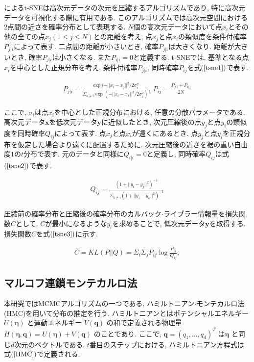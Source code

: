 \documentclass[a4j,12pt]{jarticle}
\begin{document}
\citet{tSNE}によるt-SNEは高次元データの次元を圧縮するアルゴリズムであり, 特に高次元データを可視化する際に有用である. このアルゴリズムでは高次元空間における$2$点間の近さを確率分布として表現する. $N$個の高次元データにおいて点$x_i$とその他の全ての点$x_j (1 \leq j \leq N)$との距離を考え, 点$x_j$と点$x_i$の類似度を条件付確率$P_{j|i}$によって表す. 二点間の距離が小さいとき, 確率$P_{j|i}$は大きくなり. 距離が大きいとき, 確率$P_{j|i}$は小さくなる. また$P_{i|i} = 0$と定義する. t-SNEでは, 基準となる点$x_i$を中心とした正規分布を考え, 条件付確率$P_{j|i}$, 同時確率$P_{ij}$を式$(\ref{tsne1})$で表す.

\begin{eqnarray}
\label{tsne1}
P_{j|i} = \frac{\exp(-||x_i - x_j||^2 / 2\sigma_i^2}{\Sigma_{k \neq i}\exp(-||x_i - x_k||^2/ 2\sigma_i^2)},\ 
P_{ij} = \frac{P_{j|i} + P_{i|j}}{2N}
\end{eqnarray}

\noindent
ここで, $\sigma_i$は点$x_i$を中心とした正規分布における, 任意の分散パラメータである. 高次元データ$\bm x$を低次元データ$\bm y$に近似したとき, 次元圧縮後の点$y_j$と点$y_i$の類似度を同時確率$Q_{ij}$によって表す. 点$x_j$と点$x_i$が遠くにあるとき, 点$y_j$と点$y_i$を正規分布を仮定した場合より遠くに配置するために. 次元圧縮後の近さを裾の重い自由度$1$の$t$分布で表す. 元のデータと同様に$Q_{i|i} = 0$と定義し, 同時確率$Q_{ij}$は式$(\ref{tsne2})$で表す.

\begin{eqnarray}
\label{tsne2}
Q_{ij} = \frac{(1 + ||y_i - y_j||^2)^{-1}}{\Sigma_{k \neq i}(1 + ||y_i - y_k||^2)^{-1}}
\end{eqnarray}

圧縮前の確率分布と圧縮後の確率分布のカルバック$\cdot$ライブラー情報量を損失関数$C$として, $C$が最小になるような$y_i$を求めることで, 低次元データ$\bm y$を取得する. 損失関数$C$を式$(\ref{tsne3})$に示す.

\begin{eqnarray}
\label{tsne3}
C = KL(P || Q) = \Sigma_i \Sigma_j P_{ij} \log \frac{P_{ij}}{Q_{ij}},
\end{eqnarray}

\subsection{マルコフ連鎖モンテカルロ法}

本研究ではMCMCアルゴリズムの一つである, ハミルトニアン$\cdot$モンテカルロ法(HMC)を用いて分布の推定を行う. 
ハミルトニアンとはポテンシャルエネルギー $U(\bm \eta)$ と運動エネルギー $V(\bm q)$ の和で定義される物理量 $H(\bm \eta, \bm q) = U(\bm \eta) + V(\bm q)$ のことであり. ここで, $\bm q = (q_1, \dots, q_d)^T$ は$\bm \eta$ と同じ$d$次元のベクトルである. $t$番目のステップにおける, ハミルトニアン方程式は式$(\ref{HMC})$で定義される. 
\end{document}
